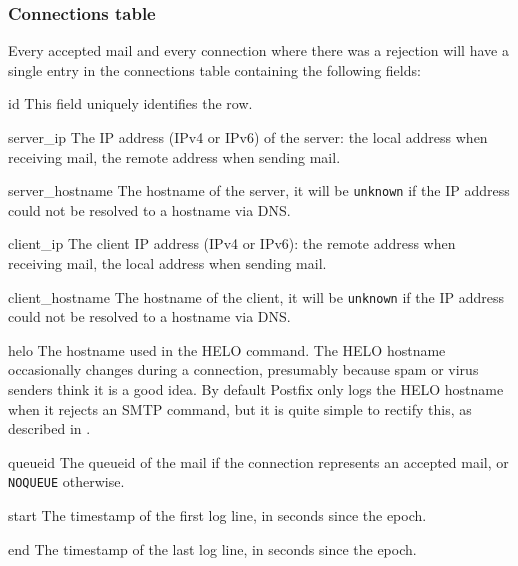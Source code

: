 \subsubsection{Connections table}

\label{connections table}

Every accepted mail and every connection where there was a rejection will
have a single entry in the connections table containing the following
fields:

\begin{eqlist}

    \item [id] This field uniquely identifies the row.

    \item [server\_ip] The \gls{IP} address (IPv4 or IPv6) of the server:
        the local address when receiving mail, the remote address when
        sending mail.

    \item [server\_hostname] The hostname of the server, it will be
        \texttt{unknown} if the \gls{IP} address could not be resolved to a
        hostname via DNS\@.

    \item [client\_ip] The client \gls{IP} address (IPv4 or IPv6): the
        remote address when receiving mail, the local address when sending
        mail.

    \item [client\_hostname] The hostname of the client, it will be
        \texttt{unknown} if the \gls{IP} address could not be resolved to a
        hostname via DNS\@.

    \item [helo] The hostname used in the HELO command.  The HELO hostname
        occasionally changes during a connection, presumably because spam
        or virus senders think it is a good idea.  By default Postfix only
        logs the HELO hostname when it rejects an \gls{SMTP} command, but
        it is quite simple to rectify this, as described in
        .

    \item [queueid] The queueid of the mail if the connection represents an
        accepted mail, or \texttt{NOQUEUE} otherwise.

    \item [start] The timestamp of the first log line, in seconds since the
        epoch.

    \item [end] The timestamp of the last log line, in seconds since the
        epoch.

\end{eqlist}

